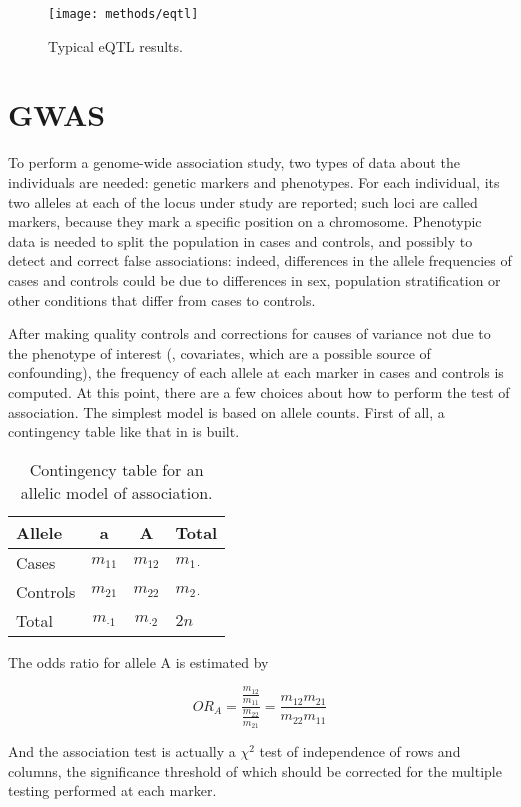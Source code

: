 \documentclass[../main.tex]{subfiles}
\begin{document}
\begin{figure}
	\texttt{[image: methods/eqtl]}
	\caption{Typical eQTL results.}
\end{figure}

\section{GWAS}

To perform a genome-wide association study\autocite{Clarke2011}, two types 
of data about the individuals are needed: genetic markers and 
phenotypes. For each individual, its two alleles at each of the locus 
under study are reported; such loci are called markers, because they 
mark a specific position on a chromosome. Phenotypic data is needed to 
split the population in cases and controls, and possibly to detect and 
correct false associations: indeed, differences in the allele 
frequencies of cases and controls could be due to differences in sex, 
population stratification or other conditions that differ from cases to 
controls\autocite{Price2006}.

After making quality controls and corrections for causes of variance not 
due to the phenotype of interest (\ie, covariates, which are a possible 
source of confounding), the frequency of each allele at each marker in 
cases and controls is computed. At this point, there are a few choices 
about how to perform the test of association. The simplest model is 
based on allele counts. First of all, a contingency table like that in 
 is built.

\begin{table}
	\begin{tabular}{ l c c l}
		\toprule
		Allele & a & A & Total \\
		\midrule
		Cases & $m_{11}$ & $m_{12}$ & $m_{1\cdot}$ \\
		Controls & $m_{21}$ & $m_{22}$ & $m_{2\cdot}$ \\
		Total & $m_{\cdot1}$ & $m_{\cdot2}$ & $2n$ \\
		\bottomrule
	\end{tabular}
	\caption{Contingency table for an allelic model of association.}
\end{table}

The odds ratio for allele A is estimated by

\begin{equation}
	OR_A = \frac{\frac{m_{12}}{m_{11}}}{\frac{m_{22}}{m_{21}}} =
		\frac{m_{12}m_{21}}{m_{22}m_{11}}
\end{equation}

And the association test is actually a $\chi^2$ test of independence of 
rows and columns, the significance threshold of which should be 
corrected for the multiple testing performed at each marker.

\end{document}
